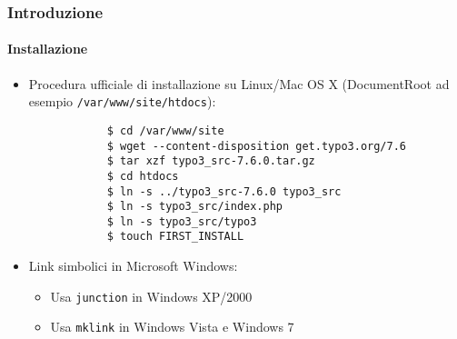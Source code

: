 \begin{frame}[fragile]
	\frametitle{Introduzione}
	\framesubtitle{Installazione}

	\begin{itemize}
		\item Procedura ufficiale di installazione su Linux/Mac OS X\newline
			(DocumentRoot ad esempio \texttt{/var/www/site/htdocs}):
		\begin{lstlisting}
			$ cd /var/www/site
			$ wget --content-disposition get.typo3.org/7.6
			$ tar xzf typo3_src-7.6.0.tar.gz
			$ cd htdocs
			$ ln -s ../typo3_src-7.6.0 typo3_src
			$ ln -s typo3_src/index.php
			$ ln -s typo3_src/typo3
			$ touch FIRST_INSTALL
		\end{lstlisting}

		\item Link simbolici in Microsoft Windows:

			\begin{itemize}
				\item Usa \texttt{junction} in Windows XP/2000
				\item Usa \texttt{mklink} in Windows Vista e Windows 7
			\end{itemize}

	\end{itemize}
\end{frame}

